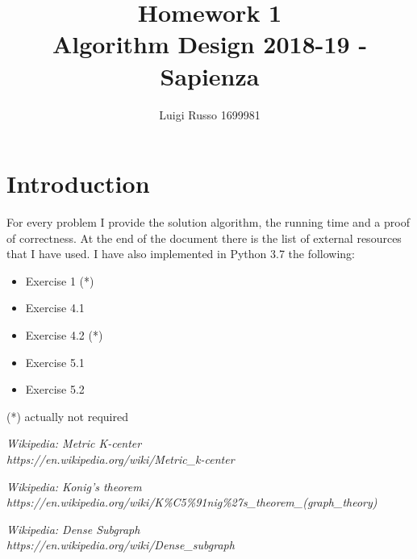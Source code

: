 \documentclass[12pt]{article}
\title{Homework 1\\
	\large Algorithm Design 2018-19 - Sapienza}
\author{Luigi Russo 1699981}
\begin{document}
	
\maketitle

\newpage
\tableofcontents
\newpage

\section*{Introduction}
For every problem I provide the solution algorithm, the running time and a proof of correctness. At the end of the document there is the list of external resources that I have used. I have also implemented in Python 3.7 the following:
\begin{itemize}
	\item Exercise 1 (*)
	\item Exercise 4.1
	\item Exercise 4.2 (*)
	\item Exercise 5.1
	\item Exercise 5.2	
\end{itemize}
(*) actually not required







\begin{thebibliography}{10}
	
	\textsl{Wikipedia: Metric K-center} \\
	\textit{https://en.wikipedia.org/wiki/Metric\_k-center}

	\textsl{Wikipedia: Konig's theorem} \\
	\textit{https://en.wikipedia.org/wiki/K\%C5\%91nig\%27s\_theorem\_(graph\_theory)}
	
	\textsl{Wikipedia: Dense Subgraph} \\
	\textit{https://en.wikipedia.org/wiki/Dense\_subgraph}	
	
\end{thebibliography}
\end{document}
